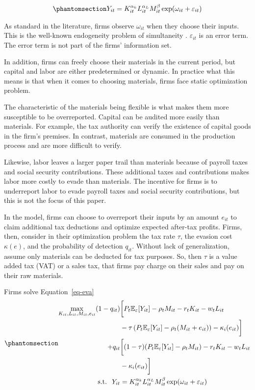 \documentclass[
  12pt]{article}
\theoremstyle{definition}
\theoremstyle{remark}
\begin{document}
\begin{equation}\phantomsection\label{eq-prod-fn}{
Y_{it}=K_{it}^{\alpha_k}L_{it}^{\alpha_L}M_{it}^{\beta}\exp(\omega_{it}+\varepsilon_{it})
}\end{equation}

As standard in the literature, firms observe \(\omega_{it}\) when they
choose their inputs. This is the well-known endogeneity problem of
simultaneity \citep{Griliches1995}. \(\varepsilon_{it}\) is an error
term. The error term is not part of the firms' information set.

In addition, firms can freely choose their materials in the current
period, but capital and labor are either predetermined or dynamic. In
practice what this means is that when it comes to choosing materials,
firms face static optimization problem.

The characteristic of the materials being flexible is what makes them
more susceptible to be overreported. Capital can be audited more easily
than materials. For example, the tax authority can verify the existence
of capital goods in the firm's premises. In contrast, materials are
consumed in the production process and are more difficult to verify.

Likewise, labor leaves a larger paper trail than materials because of
payroll taxes and social security contributions. These additional taxes
and contributions makes labor more costly to evade than materials. The
incentive for firms is to underreport labor to evade payroll taxes and
social security contributions, but this is not the focus of this paper.

In the model, firms can choose to overreport their inputs by an amount
\(e_{it}\) to claim additional tax deductions and optimize expected
after-tax profits. Firms, then, consider in their optimization problem
the tax rate \(\tau\), the evasion cost \(\kappa(e)\), and the
probability of detection \(q_{it}\). Without lack of generalization,
assume only materials can be deducted for tax purposes. So, then
\(\tau\) is a value added tax (VAT) or a sales tax, that firms pay
charge on their sales and pay on their raw materials.

Firms solve Equation~\ref{eq-eva}
\begin{equation}\phantomsection\label{eq-eva}{
\begin{aligned}
  \max_{K_{it},L_{it},M_{it}, e_{it}} (1-q_{it})&\bigg[P_t\mathbb{E}_{\varepsilon}[Y_{it}]-\rho_{t} M_{it}-r_tK_{it}-w_tL_{it}\\
  &-\tau\left(P_t\mathbb{E}_{\varepsilon}[Y_{it}]-\rho_{t} (M_{it}+e_{it})\right)-\kappa_i(e_{it})\bigg]\\
  +q_{it}&\bigg[(1-\tau)(P_t\mathbb{E}_{\varepsilon}[Y_{it}]-\rho_{t} M_{it})-r_tK_{it}-w_tL_{it}\\
  &-\kappa_i(e_{it})\bigg] \\
  \text{s.t. }\; Y_{it}&=K_{it}^{\alpha_k}L_{it}^{\alpha_L}M_{it}^{\beta}\exp(\omega_{it}+\varepsilon_{it})
\end{aligned}
}\end{equation}
\end{document}
